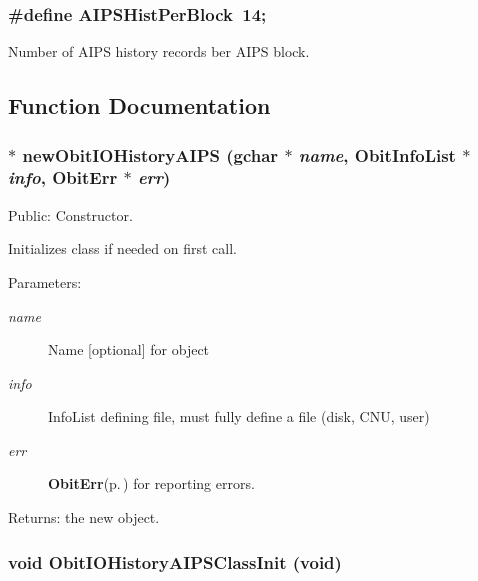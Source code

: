 \subsubsection{\setlength{\rightskip}{0pt plus 5cm}\#define AIPSHist\-Per\-Block\ 14;}\label{ObitIOHistoryAIPS_8c_a0}


Number of AIPS history records ber AIPS block. 



\subsection{Function Documentation}
\subsubsection{$\ast$ new\-Obit\-IOHistory\-AIPS (gchar $\ast$ {\em name}, {\bf Obit\-Info\-List} $\ast$ {\em info}, {\bf Obit\-Err} $\ast$ {\em err})}\label{ObitIOHistoryAIPS_8c_a10}


Public: Constructor. 

Initializes class if needed on first call. \begin{Desc}
\item[Parameters:]
\begin{description}
\item[{\em name}]Name [optional] for object \item[{\em info}]Info\-List defining file, must fully define a file (disk, CNU, user) \item[{\em err}]{\bf Obit\-Err}{\rm (p.\,\pageref{structObitErr})} for reporting errors. \end{description}
\end{Desc}
\begin{Desc}
\item[Returns:]the new object. \end{Desc}
\subsubsection{\setlength{\rightskip}{0pt plus 5cm}void Obit\-IOHistory\-AIPSClass\-Init (void)}\label{ObitIOHistoryAIPS_8c_a24}


